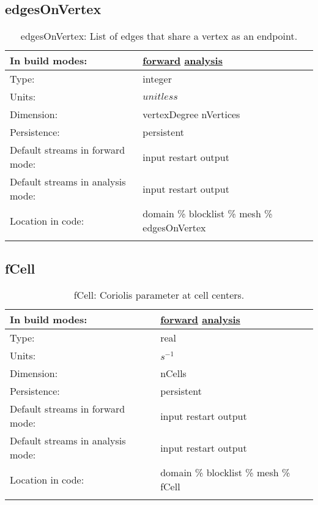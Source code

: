 \subsection[edgesOnVertex]{edgesOnVertex}
\label{subsec:var_sec_mesh_edgesOnVertex}
\begin{center}
\begin{longtable}{| p{2.0in} | p{4.0in} |}
        \hline 
        In build modes: & \hyperref[subsec:forward_var_tab_mesh]{forward} \hyperref[subsec:analysis_var_tab_mesh]{analysis} \\
        \hline 
        Type: & integer \\
        \hline 
        Units: & $unitless$ \\
        \hline 
        Dimension: & vertexDegree nVertices \\
        \hline 
        Persistence: & persistent \\
        \hline 
		 Default streams in forward mode: &  input restart output \\
        \hline 
		 Default streams in analysis mode: &  input restart output \\
        \hline 
		 Location in code: & domain \% blocklist \% mesh \% edgesOnVertex \\
		 \hline 
    \caption{edgesOnVertex: List of edges that share a vertex as an endpoint.}
\end{longtable}
\end{center}
\subsection[fCell]{fCell}
\label{subsec:var_sec_mesh_fCell}
\begin{center}
\begin{longtable}{| p{2.0in} | p{4.0in} |}
        \hline 
        In build modes: & \hyperref[subsec:forward_var_tab_mesh]{forward} \hyperref[subsec:analysis_var_tab_mesh]{analysis} \\
        \hline 
        Type: & real \\
        \hline 
        Units: & $s^{-1}$ \\
        \hline 
        Dimension: & nCells \\
        \hline 
        Persistence: & persistent \\
        \hline 
		 Default streams in forward mode: &  input restart output \\
        \hline 
		 Default streams in analysis mode: &  input restart output \\
        \hline 
		 Location in code: & domain \% blocklist \% mesh \% fCell \\
		 \hline 
    \caption{fCell: Coriolis parameter at cell centers.}
\end{longtable}
\end{center}
